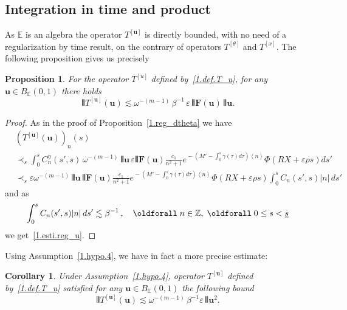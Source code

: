 \documentclass[10pt]{amsart}
\newtheorem{prop}[cdrthm]{Proposition}
\newtheorem{coro}[cdrthm]{Corollary}
\theoremstyle{definition}
\theoremstyle{plain}
\newcommand*\e{\varepsilon}
\newcommand*\Z{{\mathbb Z}}
\newcommand*\EE{{\mathbb E}}
\newcommand*\g{\gamma}
\newcommand{\ubf}{{\mathbf u}}
\newcommand*\F{{\mathbf F}}
\newcommand*\dsp{\displaystyle}
\newcommand*\und{\underline}
\DeclarePairedDelimiter{\VERT}{|\mkern -1.6mu|\mkern -1.6mu|}{|\mkern -1.6mu|\mkern -1.6mu|}
\renewcommand*{\forall}{\mathrel{\oldforall}}
\begin{document}
\subsection{Integration in time and product}

As $\EE$ is an algebra the operator $T^{[\ubf]}$ is directly bounded, with no need of a regularization by time result, on the contrary of operators $T^{[\theta]}$ and $T^{[x]}$. The following proposition gives us precisely

\begin{prop}\label{1.reg_u}
For the operator $T^{[u]}$ defined by~\eqref{1.def.T_u}, for any $\ubf\in B_{\EE}(0,1)$ there holds
\begin{equation}\label{1.esti.reg_u}
\VERT{T^{[\ubf]}(\ubf)} \lesssim \omega^{-(m-1)}\,\beta^{-1}\, \e \, \VERT{\F(\ubf)} \, \VERT{\ubf}.
\end{equation}
\end{prop}

\begin{proof}
As in the proof of Proposition~\ref{1.reg_dtheta} we have
\begin{align*}
& \left(T^{[\ubf]}(\ubf)\right)_n(s) \\
& \prec_{s} \int_{0}^{s} C_n^{\eta}(s',s) \,\omega^{-(m-1)}\,\VERT{\ubf}\, \e\VERT{\F(\ubf)} \frac{\dsp c_1}{\dsp n^2+1}e^{{}- (M'- \int_{0}^{s} \g(\tau)d\tau) \left<n\right>} \Phi\left(R X+\e\rho s\right) ds' \\
& \prec_{s} \e \omega^{-(m-1)}\,\VERT{\ubf}\, \VERT{\F(\ubf)} \frac{\dsp c_1}{\dsp n^2+1}e^{{}- (M'- \int_{0}^{s} \g(\tau)d\tau) \left<n\right>} \Phi\left(R X+\e\rho s\right) \int_{0}^{s} C_n(s',s) |n| \, ds'
\end{align*}
and as
\[
\int_{0}^{s} C_n(s',s) |n| \, ds' \lesssim \beta^{-1} \,, \quad \forall n\in\Z,\; \forall 0 \leq s <\und{s}
\]
we get~\eqref{1.esti.reg_u}.
\end{proof}

Using Assumption~\ref{1.hypo.4}, we have in fact a more precise estimate:

\begin{coro}\label{1.coro.ref.du}
Under Assumption~\ref{1.hypo.4}, operator $T^{[\ubf]}$ defined by~\eqref{1.def.T_u} satisfied for any $\ubf\in B_{\EE}(0,1)$ the following bound
\begin{equation}\label{1.esti.reg_u.bis}
\VERT{T^{[\ubf]}(\ubf)} \lesssim \omega^{-(m-1)}\, \beta^{-1} \e \, \VERT{\ubf}^2.
\end{equation}
\end{coro}
\end{document}
